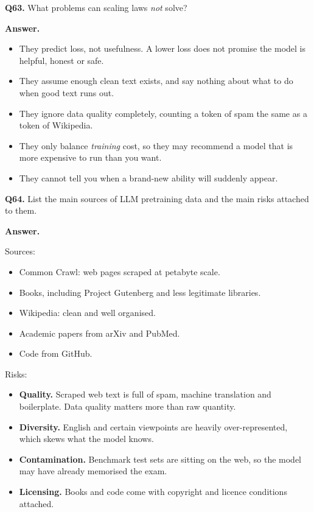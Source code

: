 \documentclass[11pt]{article}
\begin{document}
\medskip
\textbf{Q63.} What problems can scaling laws \emph{not} solve?

\textbf{Answer.}
\begin{itemize}
  \item They predict loss, not usefulness. A lower loss does not promise the model is helpful, honest or safe.
  \item They assume enough clean text exists, and say nothing about what to do when good text runs out.
  \item They ignore data quality completely, counting a token of spam the same as a token of Wikipedia.
  \item They only balance \emph{training} cost, so they may recommend a model that is more expensive to run than you want.
  \item They cannot tell you when a brand-new ability will suddenly appear.
\end{itemize}

\medskip
\textbf{Q64.} List the main sources of LLM pretraining data and the main risks attached to
them.

\textbf{Answer.}

Sources:
\begin{itemize}
  \item Common Crawl: web pages scraped at petabyte scale.
  \item Books, including Project Gutenberg and less legitimate libraries.
  \item Wikipedia: clean and well organised.
  \item Academic papers from arXiv and PubMed.
  \item Code from GitHub.
\end{itemize}

Risks:
\begin{itemize}
  \item \textbf{Quality.} Scraped web text is full of spam, machine translation and boilerplate. Data quality matters more than raw quantity.
  \item \textbf{Diversity.} English and certain viewpoints are heavily over-represented, which skews what the model knows.
  \item \textbf{Contamination.} Benchmark test sets are sitting on the web, so the model may have already memorised the exam.
  \item \textbf{Licensing.} Books and code come with copyright and licence conditions attached.
\end{itemize}
\end{document}
